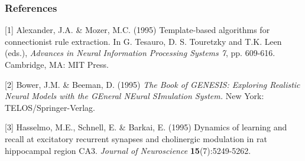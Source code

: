 \documentclass[12pt,letterpaper]{article} %
\begin{document}
\subsubsection*{References}


\small{
[1] Alexander, J.A. \& Mozer, M.C. (1995) Template-based algorithms
for connectionist rule extraction. In G. Tesauro, D. S. Touretzky
and T.K. Leen (eds.), {\it Advances in Neural Information Processing
Systems 7}, pp. 609-616. Cambridge, MA: MIT Press.

[2] Bower, J.M. \& Beeman, D. (1995) {\it The Book of GENESIS: Exploring
Realistic Neural Models with the GEneral NEural SImulation System.}
New York: TELOS/Springer-Verlag.

[3] Hasselmo, M.E., Schnell, E. \& Barkai, E. (1995) Dynamics of learning
and recall at excitatory recurrent synapses and cholinergic modulation
in rat hippocampal region CA3. {\it Journal of Neuroscience}
{\bf 15}(7):5249-5262.
}
\end{document}
